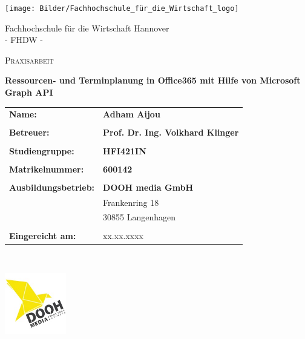 



\begin{titlepage}
    \centering
    \texttt{[image: Bilder/Fachhochschule\_für\_die\_Wirtschaft\_logo]}\par\vspace{1cm}
    Fachhochschule für die Wirtschaft Hannover \\
    - FHDW -\\
    {\scshape\Large Praxisarbeit \par}
    \vspace{1cm}
    {\huge\bfseries Ressourcen- und Terminplanung in Office365 mit Hilfe von Microsoft Graph API \par}
    \vspace{1cm}
    \normalsize{
        \begin{tabular}{l l}
            \textbf{Name:} & \textbf{Adham Aijou} \\
            \\

            \textbf{Betreuer:} & \textbf{Prof. Dr.  Ing. Volkhard Klinger}\\
            \\
            \textbf{Studiengruppe:} & \textbf{HFI421IN}\\
            \\
            \textbf{Matrikelnummer:}  & \textbf{600142} \\
            \\
            \textbf{Ausbildungsbetrieb:}  & \textbf{DOOH media GmbH}\\
            & Frankenring 18\\
            & 30855 Langenhagen    \\
            \\
            \textbf{Eingereicht am:} & xx.xx.xxxx
        \end{tabular}\\
    }
    \vfill
    \flushright \includegraphics[width=0.2\textwidth]{Bilder/doohMedia}\par\vspace{1cm}

\end{titlepage}

